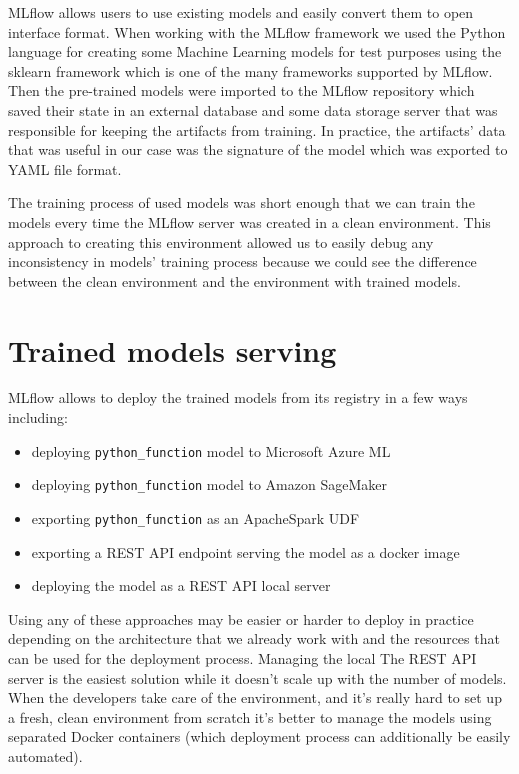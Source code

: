 MLflow allows users to use existing models and easily convert them to open interface format.
When working with the MLflow framework we used the Python language for creating some Machine
Learning models for test purposes using the sklearn framework which is one of the many frameworks
supported by MLflow. Then the pre-trained models were imported to the MLflow repository which saved
their state in an external database and some data storage server that was responsible for keeping
the artifacts from training. In practice, the artifacts' data that was useful in our case was the
signature of the model which was exported to YAML file format.

The training process of used models was short enough that we can train the models every time the
MLflow server was created in a clean environment. This approach to creating this environment
allowed us to easily debug any inconsistency in models' training process because we could see
the difference between the clean environment and the environment with trained models.

\section{Trained models serving}

MLflow allows to deploy the trained models from its registry in a few ways including:
\begin{itemize}
    \item deploying \texttt{python\_function} model to Microsoft Azure ML
    \item deploying \texttt{python\_function} model to Amazon SageMaker
    \item exporting \texttt{python\_function} as an ApacheSpark UDF
    \item exporting a REST API endpoint serving the model as a docker image
    \item deploying the model as a REST API local server
\end{itemize}

Using any of these approaches may be easier or harder to deploy in practice depending on the architecture
that we already work with and the resources that can be used for the deployment process. Managing the local
The REST API server is the easiest solution while it doesn’t scale up with the number of models. When the
developers take care of the environment, and it’s really hard to set up a fresh, clean environment
from scratch it’s better to manage the models using separated Docker containers (which deployment
process can additionally be easily automated).\cite{mlflowdoc}

